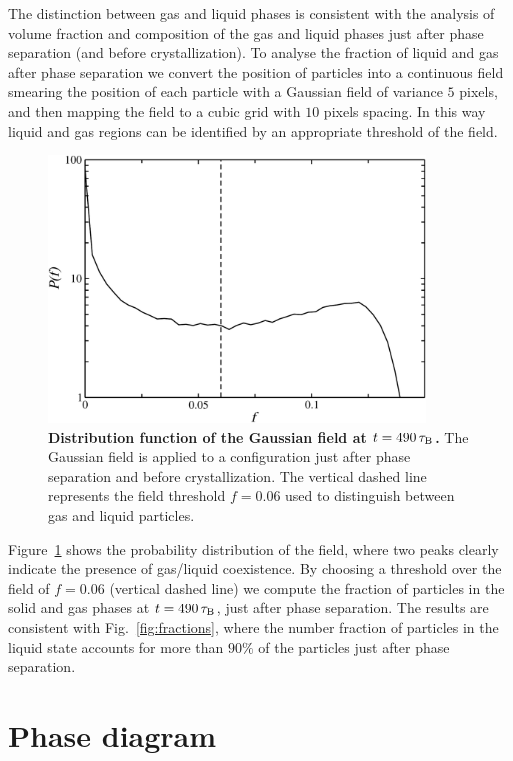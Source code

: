 The distinction between gas and liquid phases is consistent with the analysis of volume fraction and composition
of the gas and liquid phases just after phase separation (and before crystallization). To analyse the fraction
of liquid and gas after phase separation we convert the position of particles into a continuous field smearing
the position of each particle with a Gaussian field of variance $5$ pixels, and then mapping the field
to a cubic grid with $10$ pixels spacing. In this way liquid and gas regions can be identified by
an appropriate threshold of the field.

\begin{figure}[!b]
 \centering
 \includegraphics[width=10cm]{./field.pdf}
 \caption{{\bf Distribution function of the Gaussian field at $t=490\,\tau_{\rm B}$.} The Gaussian field is applied to
 a configuration just after phase separation and before crystallization. The vertical dashed line represents the
 field threshold $f=0.06$ used to distinguish between gas and liquid particles.}
 \label{fig:field}
\end{figure}

Figure~\ref{fig:field} shows the probability distribution of the field, where two peaks clearly indicate the presence
of gas/liquid coexistence. By choosing a threshold over the field of $f=0.06$ (vertical dashed line) we compute the fraction 
of particles in the solid and gas phases at $t=490\,\tau_{\rm B}$, just after phase separation. The results are consistent
with Fig.~\ref{fig:fractions}, where the number fraction of particles in the liquid state accounts for more than
$90\%$ of the particles just after phase separation.

\section*{Phase diagram}

